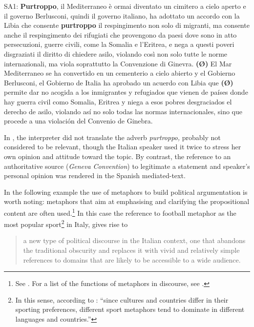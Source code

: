 \documentclass[output=paper]{langscibook}
\begin{document}
\ea\label{ex:mori:21}
\ea
SA1: \textbf{Purtroppo}, il Mediterraneo è ormai diventato un cimitero a cielo aperto e il governo Berlusconi, quindi il governo italiano, ha adottato un accordo con la Libia che consente \textbf{purtroppo} il respingimento non solo di migranti, ma consente anche il respingimento dei rifugiati che provengono da paesi dove sono in atto persecuzioni, guerre civili, come la Somalia e l'Eritrea, e nega a questi poveri disgraziati il diritto di chiedere asilo, violando così non solo tutte le norme internazionali, ma viola soprattutto la Convenzione di Ginevra.
\ex
\textbf{(Ø)} El Mar Mediterraneo se ha convertido en un cementerio a cielo abierto y el Gobierno Berlusconi, el Gobierno de Italia ha aprobado un acuerdo con Libia que \textbf{(Ø)} permite dar no acogida a los inmigrantes y refugiados que vienen de países donde hay guerra civil como Somalia, Eritrea y niega a esos pobres desgraciados el derecho de asilo, violando así no solo todas las normas internacionales, sino que procede a una violación del Convenio de Ginebra.
\z
\z

In , the interpreter did not translate the adverb \textit{purtroppo,} probably not considered to be relevant, though the Italian speaker used it twice to stress her own opinion and attitude toward the topic. By contrast, the reference to an authoritative source (\textit{Geneva Convention}) to legitimate a statement and speaker’s personal opinion was rendered in the Spanish mediated-text.

In the following example  the use of metaphors to build political argumentation is worth noting: metaphors that aim at emphasising and clarifying the propositional content are often used.\footnote{See \citet{Taylor2020}. For a list of the functions of metaphors in discourse, see \citet[30--32]{Semino2008}.} In this case the reference to football metaphor as the most popular sport\footnote{In this sense, according to \citet[98]{Semino2008}: “since cultures and countries differ in their sporting preferences, different sport metaphors tend to dominate in different languages and countries.”} in Italy, gives rise to

\begin{quote}
 a new type of political discourse in the Italian context, one that abandons the traditional obscurity and replaces it with vivid and relatively simple references to domains that are likely to be accessible to a wide audience. \citep[266]{Semino1996}
\end{quote}
\end{document}
